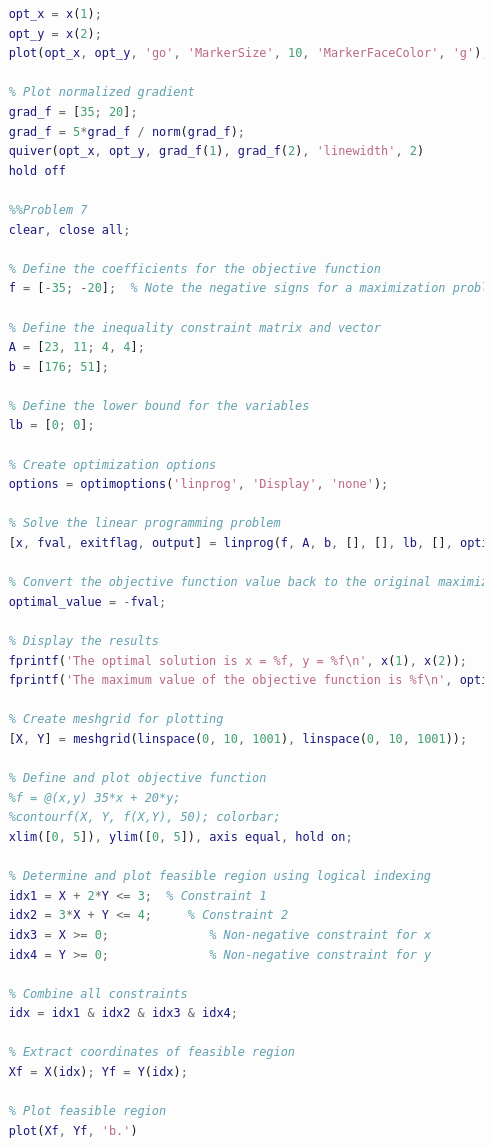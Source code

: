 \documentclass[12pt]{article}
\begin{document}
\begin{lstlisting}[language=Matlab, basicstyle=\scriptsize]
    % Mark the optimal solution
    opt_x = x(1);
    opt_y = x(2);
    plot(opt_x, opt_y, 'go', 'MarkerSize', 10, 'MarkerFaceColor', 'g');
    
    % Plot normalized gradient
    grad_f = [35; 20];
    grad_f = 5*grad_f / norm(grad_f);
    quiver(opt_x, opt_y, grad_f(1), grad_f(2), 'linewidth', 2)
    hold off
    
    %%Problem 7
    clear, close all;
    
    % Define the coefficients for the objective function
    f = [-35; -20];  % Note the negative signs for a maximization problem
    
    % Define the inequality constraint matrix and vector
    A = [23, 11; 4, 4];
    b = [176; 51];
    
    % Define the lower bound for the variables
    lb = [0; 0];
    
    % Create optimization options
    options = optimoptions('linprog', 'Display', 'none');
    
    % Solve the linear programming problem
    [x, fval, exitflag, output] = linprog(f, A, b, [], [], lb, [], options);
    
    % Convert the objective function value back to the original maximization problem
    optimal_value = -fval;
    
    % Display the results
    fprintf('The optimal solution is x = %f, y = %f\n', x(1), x(2));
    fprintf('The maximum value of the objective function is %f\n', optimal_value);
    
    % Create meshgrid for plotting
    [X, Y] = meshgrid(linspace(0, 10, 1001), linspace(0, 10, 1001));
    
    % Define and plot objective function
    %f = @(x,y) 35*x + 20*y;
    %contourf(X, Y, f(X,Y), 50); colorbar;
    xlim([0, 5]), ylim([0, 5]), axis equal, hold on;
    
    % Determine and plot feasible region using logical indexing
    idx1 = X + 2*Y <= 3;  % Constraint 1
    idx2 = 3*X + Y <= 4;     % Constraint 2
    idx3 = X >= 0;              % Non-negative constraint for x
    idx4 = Y >= 0;              % Non-negative constraint for y
    
    % Combine all constraints
    idx = idx1 & idx2 & idx3 & idx4;
    
    % Extract coordinates of feasible region
    Xf = X(idx); Yf = Y(idx);
    
    % Plot feasible region
    plot(Xf, Yf, 'b.')
    

\end{lstlisting}
\end{document}
